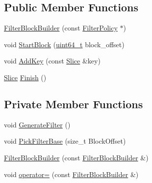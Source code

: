 \subsection*{Public Member Functions}
\begin{DoxyCompactItemize}
\item 
\hyperlink{classleveldb_1_1_filter_block_builder_a8e8b5ae95df5a13c035bec85e22549ca}{Filter\+Block\+Builder} (const \hyperlink{classleveldb_1_1_filter_policy}{Filter\+Policy} $\ast$)
\item 
void \hyperlink{classleveldb_1_1_filter_block_builder_a766a753a200f7386196a68897e47c1c3}{Start\+Block} (\hyperlink{stdint_8h_aaa5d1cd013383c889537491c3cfd9aad}{uint64\+\_\+t} block\+\_\+offset)
\item 
void \hyperlink{classleveldb_1_1_filter_block_builder_a4fd9db735c5c72973cec62e4fd98137d}{Add\+Key} (const \hyperlink{classleveldb_1_1_slice}{Slice} \&key)
\item 
\hyperlink{classleveldb_1_1_slice}{Slice} \hyperlink{classleveldb_1_1_filter_block_builder_a75fa127d8af42e749abdd235eed97cad}{Finish} ()
\end{DoxyCompactItemize}
\subsection*{Private Member Functions}
\begin{DoxyCompactItemize}
\item 
void \hyperlink{classleveldb_1_1_filter_block_builder_ab9141e1d64c8dc779a5fc9eae390407a}{Generate\+Filter} ()
\item 
void \hyperlink{classleveldb_1_1_filter_block_builder_a90fd35aca59a4622773b7d4e341a8a4a}{Pick\+Filter\+Base} (size\+\_\+t Block\+Offset)
\item 
\hyperlink{classleveldb_1_1_filter_block_builder_a5f999cf28b5cc91c8a79f64b40a7ff1a}{Filter\+Block\+Builder} (const \hyperlink{classleveldb_1_1_filter_block_builder}{Filter\+Block\+Builder} \&)
\item 
void \hyperlink{classleveldb_1_1_filter_block_builder_a14f852d72d7ebde56e0827f619ce796d}{operator=} (const \hyperlink{classleveldb_1_1_filter_block_builder}{Filter\+Block\+Builder} \&)
\end{DoxyCompactItemize}
